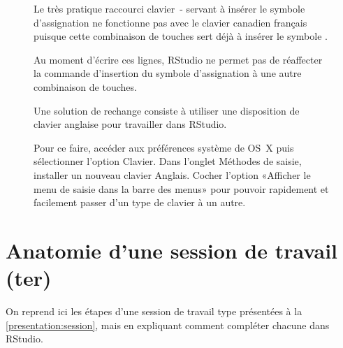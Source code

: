 \begin{figure}[t]
  \begin{osx}
    Le très pratique raccourci clavier {\optkey\,-} servant à insérer
    le symbole d'assignation ne fonctionne pas avec le clavier
    canadien français puisque cette combinaison de touches sert déjà à
    insérer le symbole \textbar.

    Au moment d'écrire ces lignes, RStudio ne permet pas de réaffecter
    la commande d'insertion du symbole d'assignation à une autre
    combinaison de touches.

    Une solution de rechange consiste à utiliser une disposition de
    clavier anglaise pour travailler dans RStudio.

    Pour ce faire, accéder aux préférences système de OS~X puis
    sélectionner l'option Clavier. Dans l'onglet Méthodes de saisie,
    installer un nouveau clavier Anglais. Cocher l'option «Afficher le
    menu de saisie dans la barre des menus» pour pouvoir rapidement et
    facilement passer d'un type de clavier à un autre.
  \end{osx}
  \label{fig:rstudio:assignation}
\end{figure}


\section{Anatomie d'une session de travail (ter)}
\label{rstudio:session}

On reprend ici les étapes d'une %
session de travail %
type présentées à la \autoref{presentation:session}, mais en
expliquant comment compléter chacune dans RStudio.

